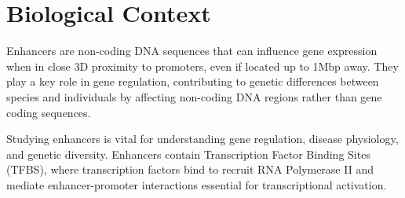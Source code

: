 \section{Biological Context}
Enhancers are non-coding DNA sequences that can influence gene expression when in close 3D proximity to promoters, even if located up to 1Mbp away. They play a key role in gene regulation, contributing to genetic differences between species and individuals by affecting non-coding DNA regions rather than gene coding sequences.


Studying enhancers is vital for understanding gene regulation, disease physiology, and genetic diversity. Enhancers contain Transcription Factor Binding Sites (TFBS), where transcription factors bind to recruit RNA Polymerase II and mediate enhancer-promoter interactions essential for transcriptional activation.

